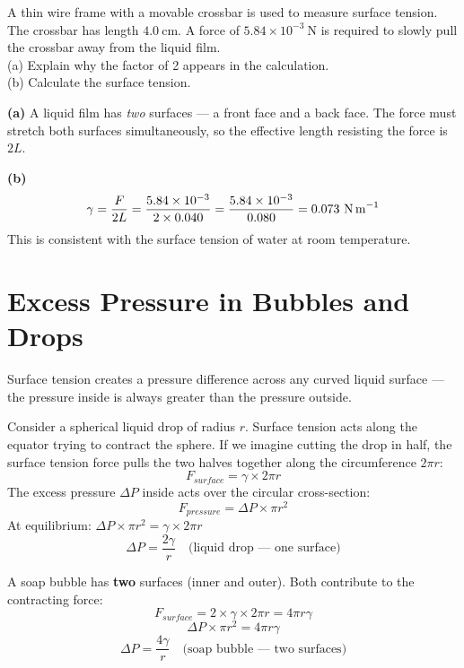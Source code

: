 \begin{examplebox}[12.1]
A thin wire frame with a movable crossbar is used to
measure surface tension. The crossbar has length
$4.0\ \text{cm}$. A force of $5.84\times10^{-3}\ \text{N}$
is required to slowly pull the crossbar away from
the liquid film.\\
(a) Explain why the factor of 2 appears in the
calculation.\\
(b) Calculate the surface tension.
\end{examplebox}

\begin{solutionbox}
\textbf{(a)} A liquid film has \textit{two} surfaces
--- a front face and a back face. The force must
stretch both surfaces simultaneously, so the
effective length resisting the force is $2L$.

\textbf{(b)}
\[
  \gamma = \frac{F}{2L}
  = \frac{5.84\times10^{-3}}{2 \times 0.040}
  = \frac{5.84\times10^{-3}}{0.080}
  = 0.073\ \text{N\,m}^{-1}
\]
This is consistent with the surface tension of
water at room temperature.
\end{solutionbox}

\section{Excess Pressure in Bubbles and Drops}

Surface tension creates a pressure difference across
any curved liquid surface --- the pressure inside is
always greater than the pressure outside.

\begin{processbox}
Consider a spherical liquid drop of radius $r$.
Surface tension acts along the equator trying to
contract the sphere. If we imagine cutting the drop
in half, the surface tension force pulls the two
halves together along the circumference $2\pi r$:
\[
  F_{surface} = \gamma \times 2\pi r
\]
The excess pressure $\Delta P$ inside acts over the
circular cross-section:
\[
  F_{pressure} = \Delta P \times \pi r^2
\]
At equilibrium: $\Delta P \times \pi r^2
= \gamma \times 2\pi r$
\[
  \boxed{\Delta P = \frac{2\gamma}{r}}
  \quad \text{(liquid drop --- one surface)}
\]
\end{processbox}

\begin{processbox}
A soap bubble has \textbf{two} surfaces (inner and
outer). Both contribute to the contracting force:
\[
  F_{surface} = 2 \times \gamma \times 2\pi r
  = 4\pi r \gamma
\]
\[
  \Delta P \times \pi r^2 = 4\pi r \gamma
\]
\[
  \boxed{\Delta P = \frac{4\gamma}{r}}
  \quad \text{(soap bubble --- two surfaces)}
\]
\end{processbox}

